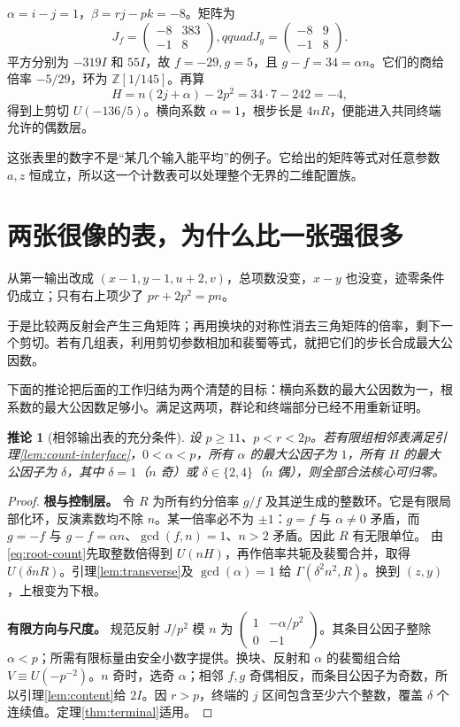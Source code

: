 \documentclass[11pt,a4paper,oneside,openany]{book}
\newcommand{\Z}{\mathbb Z}
\newtheorem{corollary}[theorem]{推论}
\theoremstyle{definition}
\numberwithin{equation}{chapter}
\begin{document}
$\alpha=i-j=1$，$\beta=rj-pk=-8$。矩阵为
\[
J_f=\begin{pmatrix}-8&383\\-1&8\end{pmatrix},qquad
J_g=\begin{pmatrix}-8&9\\-1&8\end{pmatrix}.
\]
平方分别为 $-319I$ 和 $55I$，故 $f=-29,g=5$，且 $g-f=34=\alpha n$。它们的商给倍率 $-5/29$，环为 $\Z[1/145]$。再算
\[H=n(2j+\alpha)-2p^2=34\cdot7-242=-4,
\]
得到上剪切 $U(-136/5)$。横向系数 $\alpha=1$，根步长是 $4nR$，便能进入共同终端允许的偶数层。

这张表里的数字不是“某几个输入能平均”的例子。它给出的矩阵等式对任意参数 $a,z$ 恒成立，所以这一个计数表可以处理整个无界的二维配置族。

\section{两张很像的表，为什么比一张强很多}
从第一输出改成 $(x-1,y-1,u+2,v)$，总项数没变，$x-y$ 也没变，迹零条件仍成立；只有右上项少了 $pr+2p^2=pn$。

于是比较两反射会产生三角矩阵；再用换块的对称性消去三角矩阵的倍率，剩下一个剪切。若有几组表，利用剪切参数相加和裴蜀等式，就把它们的步长合成最大公因数。

下面的推论把后面的工作归结为两个清楚的目标：横向系数的最大公因数为一，根系数的最大公因数足够小。满足这两项，群论和终端部分已经不用重新证明。
\begin{corollary}[相邻输出表的充分条件]\label{cor:resource}
设 $p\ge11$、$p<r<2p$。若有限组相邻表满足引理\ref{lem:count-interface}，$0<\alpha<p$，所有 $\alpha$ 的最大公因子为 $1$，所有 $H$ 的最大公因子为 $\delta$，其中 $\delta=1$（$n$ 奇）或 $\delta\in\{2,4\}$（$n$ 偶），则全部合法核心可归零。
\end{corollary}
\begin{proof}

\par\noindent\textbf{根与控制层。}
令 $R$ 为所有约分倍率 $g/f$ 及其逆生成的整数环。它是有限局部化环，反演素数均不除 $n$。某一倍率必不为 $\pm1$：$g=f$ 与 $\alpha\ne0$ 矛盾，而 $g=-f$ 与 $g-f=\alpha n$、$\gcd(f,n)=1$、$n>2$ 矛盾。因此 $R$ 有无限单位。
由\eqref{eq:root-count}先取整数倍得到 $U(nH)$，再作倍率共轭及裴蜀合并，取得 $U(\delta nR)$。引理\ref{lem:transverse}及 $\gcd(\alpha)=1$ 给 $\Gamma(\delta^2n^2,R)$。换到 $(z,y)$，上根变为下根。

\par\noindent\textbf{有限方向与尺度。}
规范反射 $J/p^2$ 模 $n$ 为 $\left(\begin{smallmatrix}1&-\alpha/p^2\\0&-1\end{smallmatrix}\right)$。其条目公因子整除 $\alpha<p$；所需有限标量由安全小数字提供。换块、反射和 $\alpha$ 的裴蜀组合给 $V\equiv U(-p^{-2})$。$n$ 奇时，选奇 $\alpha$；相邻 $f,g$ 奇偶相反，而条目公因子为奇数，所以引理\ref{lem:content}给 $2I$。因 $r>p$，终端的 $j$ 区间包含至少六个整数，覆盖 $\delta$ 个连续值。定理\ref{thm:terminal}适用。
\end{proof}
\end{document}
